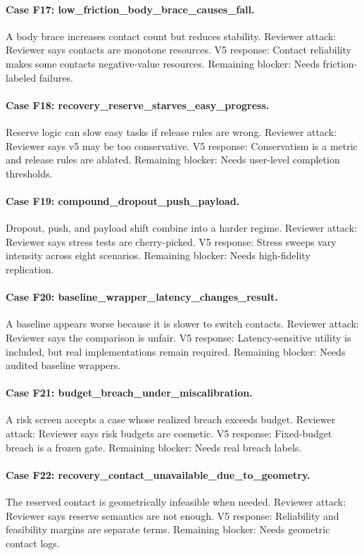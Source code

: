 \documentclass{article}
\begin{document}
\paragraph{Case F17: low\_friction\_body\_brace\_causes\_fall.} A body brace increases contact count but reduces stability. Reviewer attack: Reviewer says contacts are monotone resources. V5 response: Contact reliability makes some contacts negative-value resources. Remaining blocker: Needs friction-labeled failures.
\paragraph{Case F18: recovery\_reserve\_starves\_easy\_progress.} Reserve logic can slow easy tasks if release rules are wrong. Reviewer attack: Reviewer says v5 may be too conservative. V5 response: Conservatism is a metric and release rules are ablated. Remaining blocker: Needs user-level completion thresholds.
\paragraph{Case F19: compound\_dropout\_push\_payload.} Dropout, push, and payload shift combine into a harder regime. Reviewer attack: Reviewer says stress tests are cherry-picked. V5 response: Stress sweeps vary intensity across eight scenarios. Remaining blocker: Needs high-fidelity replication.
\paragraph{Case F20: baseline\_wrapper\_latency\_changes\_result.} A baseline appears worse because it is slower to switch contacts. Reviewer attack: Reviewer says the comparison is unfair. V5 response: Latency-sensitive utility is included, but real implementations remain required. Remaining blocker: Needs audited baseline wrappers.
\paragraph{Case F21: budget\_breach\_under\_miscalibration.} A risk screen accepts a case whose realized breach exceeds budget. Reviewer attack: Reviewer says risk budgets are cosmetic. V5 response: Fixed-budget breach is a frozen gate. Remaining blocker: Needs real breach labels.
\paragraph{Case F22: recovery\_contact\_unavailable\_due\_to\_geometry.} The reserved contact is geometrically infeasible when needed. Reviewer attack: Reviewer says reserve semantics are not enough. V5 response: Reliability and feasibility margins are separate terms. Remaining blocker: Needs geometric contact logs.
\end{document}
